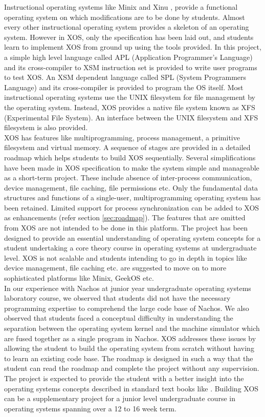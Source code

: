 \documentclass{sig-alternate}
\begin{document}
 
Instructional operating systems like Minix and Xinu \cite{survey}, provide a functional operating system on which modifications are to be done by students. Almost every other instructional operating system provides a skeleton of an operating system. However in XOS, only the specification has been laid out, and students learn to implement XOS from ground up using the tools provided. In this project, a simple high level language called APL (Application Programmer's Language) and its cross-compiler to XSM instruction set is provided to write user programs to test XOS. An XSM dependent language called SPL (System Programmers Language) and its cross-compiler is provided to program the OS itself. Most instructional operating systems use the UNIX filesystem for file management by the operating system. Instead, XOS provides a native file system known as XFS (Experimental File System). An interface between the UNIX filesystem and XFS filesystem is also provided.  \\

XOS has features like multiprogramming, process management, a primitive  filesystem and virtual memory. A sequence of stages are provided in a detailed roadmap which helps students to build XOS sequentially. Several simplifications have been made in XOS specification to make the system simple and manageable as a short-term project. These include absence of inter-process communication, device management, file caching, file permissions etc.  Only the fundamental data structures and functions of a single-user, multiprogramming operating system has been retained. Limited support for process synchronization can be added to XOS as enhancements (refer section \ref{sec:roadmap}). The features that are omitted from XOS are not intended to be done in this platform. The project has been designed to provide an essential understanding of operating system concepts for a student undertaking a core theory course in  operating systems at undergraduate level. XOS is not scalable and students intending to go in depth in topics like device management, file caching etc. are suggested to move on to more sophisticated platforms like Minix, GeekOS\cite{survey} etc. \\

In our experience with Nachos at junior year undergraduate operating systems laboratory course, we observed that students did not have the necessary programming expertise to comprehend the large code base of Nachos.  We also observed that students faced a conceptual difficulty in understanding the separation between the operating system kernel and the machine simulator which are fused together as a single program in Nachos. XOS addresses these issues by allowing the student to build the operating system from scratch without having to learn an existing code base. The roadmap is designed in such a way that the student can read the roadmap and complete the project without any supervision. The project is expected to provide the student with a better insight into the operating systems concepts described in standard text books like \cite{silberschatz}. Building XOS can be a supplementary project for a junior level undergraduate course in operating systems spanning over a 12 to 16 week term. \\
\end{document}
